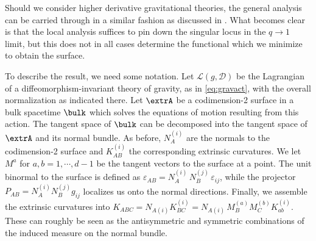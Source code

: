 \documentclass[12pt,openany]{book}
\begin{document}
Should we consider higher derivative gravitational theories, the general analysis can be carried through in a similar fashion as discussed in \cite{Fursaev:2013fta,Dong:2013qoa,Camps:2013zua}. What becomes clear is that the local analysis suffices to pin down the singular locus in the $q\to 1$ limit, but this does not in all cases determine the functional which we minimize to obtain the surface.

To describe the result, we need some notation. Let $\mathcal{L}(g,\mathcal{D})$ be the Lagrangian of a diffeomorphism-invariant theory of gravity, as in \eqref{eq:gravact}, with the overall normalization as indicated there. Let $\extrA$ be a codimension-2 surface in a bulk spacetime $\bulk$ which solves the equations of motion resulting from this action. The tangent space of $\bulk$ can be decomposed into the tangent space of $\extrA$ and its normal bundle. As before, $N^{(i)}_A$ are the normals to the codimension-2 surface and $K^{(i)}_{AB}$ the corresponding extrinsic curvatures. We let $M^a$ for $a,b=1,\cdots, d-1$ be the tangent vectors to the surface at a point.  The unit binormal to the surface is defined as
$\varepsilon_{AB} = N^{(i)}_A \, N^{(j)}_B\, \varepsilon_{ij}$, while the projector $P_{AB} = N^{(i)}_A N^{(j)}_B g_{ij} $ localizes us onto the normal directions.  Finally, we assemble the extrinsic curvatures into
$K_{ABC} = N_{A(i)} K_{BC}^{(i)} =  N_{A(i)}\, M_B^{(a)} M_C^{(b)} K_{ab}^{(i)}$.
These can roughly be seen as the antisymmetric and symmetric combinations of the induced measure on the normal bundle.
\end{document}
